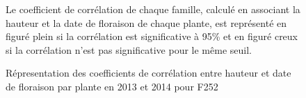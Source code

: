 \documentclass[12pt,a4paper]{article}
\begin{document}
			 				\begin{figure} [!h]
			 					\caption{Répresentation des coefficients de corrélation entre hauteur et date de floraison par plante en 2013 et 2014 pour F252 \label{correlf252}}
			 					Le coefficient de corrélation de chaque famille, calculé en associant la hauteur et la date de floraison de chaque plante, est représenté en figuré plein si la corrélation est significative à 95\% et en figuré creux si la corrélation n'est pas significative pour le même seuil.
			 				\end{figure}
\end{document}
